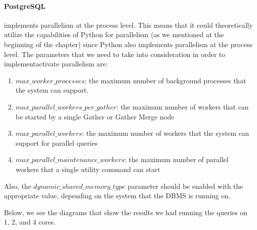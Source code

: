 \paragraph{PostgreSQL} implements parallelism at the process level. 
This means that it could theoretically utilize the capabilities of Python 
for parallelism (as we mentioned at the beginning of the chapter) 
since Python also implements parallelism at the process level. The
parameters that we need to take into consideration in order to 
implement\/activate parallelism are:
\begin{enumerate}
	\item $max\_worker\_processes$: the maximum number of background 
	processes that the system can support.
	\item $max\_parallel\_workers\_per\_gather$: the maximum number of 
	workers that can be started by a single Gather or Gather Merge node
	\item $max\_parallel\_workers$: the maximum number of workers that the 
	system can support for parallel queries
	\item $max\_parallel\_maintenance\_workers$: the maximum number of 
	parallel workers that a single utility command can start
\end{enumerate}
Also, the $dynamic\_shared\_memory\_type$ parameter should be enabled with
the appropriate value, depending on the system that the DBMS is running on.

Below, we see the diagrams that show the results we had running the queries 
on 1, 2, and 4 cores.

